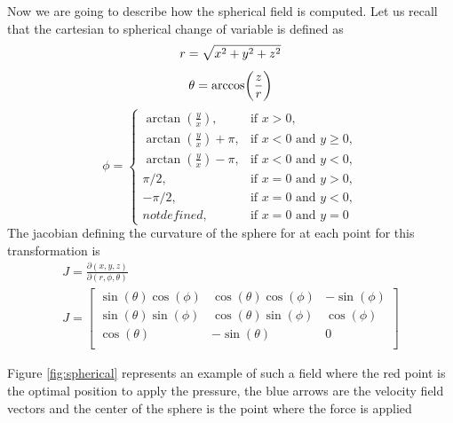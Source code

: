Now we are going to describe how the spherical field is computed. 
Let us recall that the cartesian to spherical change of variable is defined as
\begin{equation} 
    r = \sqrt{x^2+y^2+z^2}\\ \nonumber 
\end{equation}
\begin{equation}
    \theta = \arccos(\frac{z}{r})\\\nonumber 
\end{equation}
\begin{equation}
    \label{transformation}
    \phi =
    \begin{cases}
        \arctan(\frac{y}{x}), & \text{if $x>0$},\\
        \arctan(\frac{y}{x}) + \pi, & \text{if $x<0$ and $y\geq 0$},\\
        \arctan(\frac{y}{x}) - \pi, & \text{if $x<0$ and $y<0$},\\
        \pi/2, & \text{if $x=0$ and $y>0$},\\
        -\pi/2, & \text{if $x=0$ and $y<0$},\\
        not defined , & \text{if $x=0$ and $y=0$}
    \end{cases}       
\end{equation}  
The jacobian defining the curvature of the sphere for at each point for this transformation is 
\begin{align}
    J = \frac{\partial{(x,y,z)}}{\partial{(r,\phi,\theta)}} \nonumber\\
    J = \begin{bmatrix}
        \sin(\theta)\cos(\phi) & \cos(\theta)\cos(\phi) & -\sin(\phi)\\
        \sin(\theta)\sin(\phi) & \cos(\theta)\sin(\phi) & \cos(\phi)\\
        \cos(\theta) & -\sin(\theta) & 0\\
        \end{bmatrix}
        \label{jacobian}
\end{align}

Figure \ref{fig:spherical} represents an example of such a field where the red point is the optimal position to apply the pressure, the blue arrows are the velocity field vectors and the center of the sphere is the point where the force is applied

